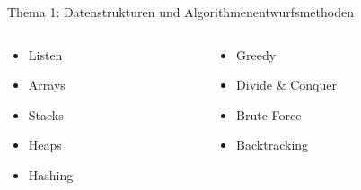 \documentclass[aspectratio=169,xcolor=dvipsnames, t]{beamer}
\begin{document}
	\begin{frame}{Thema 1: Datenstrukturen und Algorithmenentwurfsmethoden}
		\begin{columns}
			\begin{column}{0.5\textwidth}
				\begin{itemize}
					\item Listen
					\item Arrays
					\item Stacks
					\item Heaps
					\item Hashing
				\end{itemize}
			\end{column}
			\begin{column}{0.5\textwidth}
				\begin{itemize}
					\item Greedy
					\item Divide \& Conquer
					\item Brute-Force
					\item Backtracking
				\end{itemize}
			\end{column}
		\end{columns}
	\end{frame}
	
	
\end{document}
